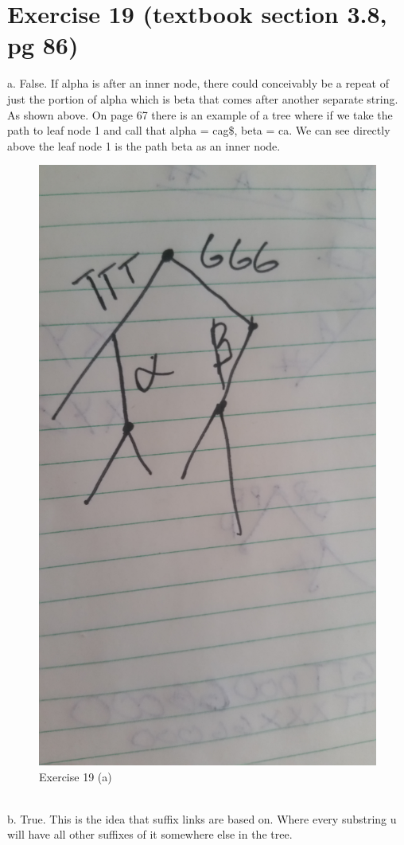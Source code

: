 \documentclass{article}
\begin{document}
\pagebreak

\section{Exercise 19 (textbook section 3.8, pg 86)}
a. False. If alpha is after an inner node, there could conceivably be a repeat of just the portion of alpha which is beta that comes after another separate string. As shown above. On page 67 there is an example of a tree where if we take the path to leaf node 1 and call that alpha = cag\$, beta = ca. We can see directly above the leaf node 1 is the path beta as an inner node.
\begin{figure}
    \includegraphics[width=1.75\textwidth,center]{problem19.jpg}
    \caption{Exercise 19 (a)}
\end{figure}\\
b. True. This is the idea that suffix links are based on. Where every substring u will have all other suffixes of it somewhere else in the tree.
\end{document}
